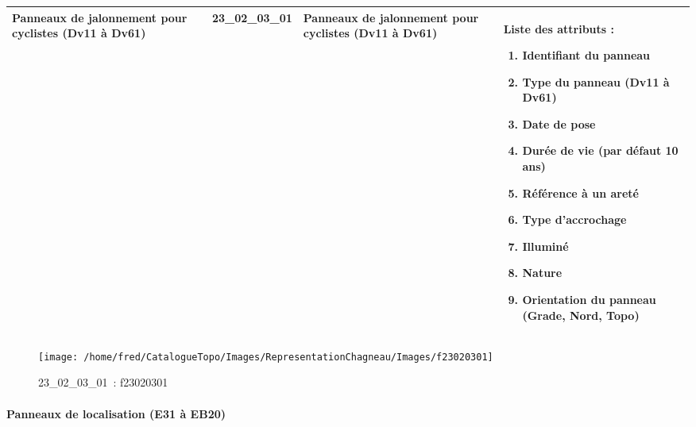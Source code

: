 \documentclass[12pt,titlepage]{book}
\begin{document}
\renewcommand{\arraystretch}{1.2}
\begin{supertabular}{|p{10cm}|c|p{13cm}|p{12cm}|}
 Panneaux de jalonnement pour cyclistes (Dv11 à Dv61) & 23\_02\_03\_01 & Panneaux de jalonnement pour cyclistes (Dv11 à Dv61) & Liste des attributs :
\begin{enumerate}
  \item Identifiant du panneau  \item Type du panneau (Dv11 à Dv61)  \item Date de pose  \item Durée de vie (par défaut 10 ans)  \item Référence à un areté  \item Type d'accrochage  \item Illuminé  \item Nature  \item Orientation du panneau (Grade, Nord, Topo)\end{enumerate}
\\
\hline
\end{supertabular}
\begin{figure}[h!]
  \hfill         %
  \begin{minipage}[t]{3cm}
    \begin{center}
      \texttt{[image: /home/fred/CatalogueTopo/Images/RepresentationChagneau/Images/f23020301]}
      \caption[~23\_02\_03\_01]{\small{23\_02\_03\_01~:} \tiny{f23020301}}\label{f23020301}
    \end{center}
  \end{minipage}
\end{figure}


\paragraph{Panneaux de localisation (E31 à EB20)}
\noindent
\vspace{\baselineskip}
\end{document}
